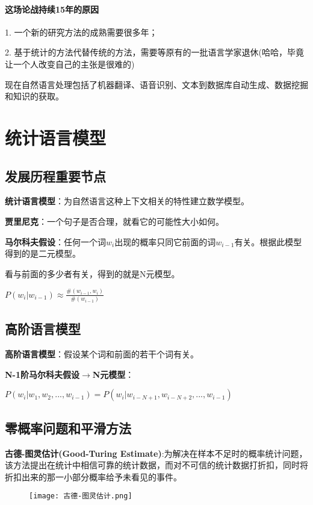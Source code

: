 \documentclass[UTF8]{article}
\begin{document}
	\paragraph{这场论战持续15年的原因}

	1. 一个新的研究方法的成熟需要很多年；

	2. 基于统计的方法代替传统的方法，需要等原有的一批语言学家退休(哈哈，毕竟让一个人改变自己的主张是很难的) 

	现在自然语言处理包括了机器翻译、语音识别、文本到数据库自动生成、数据挖掘和知识的获取。
	\section{统计语言模型}
	\subsection{发展历程重要节点}
	\textbf{统计语言模型}：为自然语言这种上下文相关的特性建立数学模型。

	\textbf{贾里尼克}：一个句子是否合理，就看它的可能性大小如何。

	\textbf{马尔科夫假设}：任何一个词$w_i$出现的概率只同它前面的词$w_{i-1}$有关。根据此模型得到的是二元模型。

	看与前面的多少者有关，得到的就是N元模型。

	\textbf{$P(w_i|w_{i-1})\approx\frac{\#(w_{i-1},w_i)}{\#(w_{i-1})}$}

	\subsection{高阶语言模型}
	\textbf{高阶语言模型}：假设某个词和前面的若干个词有关。

	\textbf{N-1阶马尔科夫假设$\to$N元模型}：

	$P(w_i|w_1,w_2,...,w_{i-1}) = P(w_i|w_{i-N+1},w_{i-N+2},...,w_{i-1})$

	\subsection{零概率问题和平滑方法}
	\textbf{古德-图灵估计(Good-Turing Estimate)}:为解决在样本不足时的概率统计问题，该方法提出在统计中相信可靠的统计数据，而对不可信的统计数据打折扣，同时将折扣出来的那一小部分概率给予未看见的事件。

	\begin{figure}[!htb]
	\centering
	\texttt{[image: 古德-图灵估计.png]}
	\label{古德-图灵估计}
	\end{figure}
\end{document}
